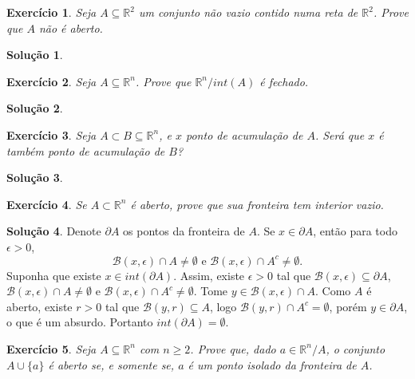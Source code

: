 \documentclass[a4paper,12pt]{article}
\newcommand{\R}{\mathbb{R}}
\newcommand{\B}{\mathcal{B}}
\theoremstyle{exer}
\newtheorem{exercise}{Exercício}
\theoremstyle{definition}
\newtheorem{solution}{Solução}
\theoremstyle{plain}
\begin{document}
\begin{exercise}
    Seja $A \subseteq \R^2$ um conjunto não vazio contido numa reta de $\R^2$. Prove que $A$ não é
    aberto.
\end{exercise}

\begin{solution}

\end{solution}

\begin{exercise}
    Seja $A \subseteq \R^n$. Prove que $\R^n/int(A)$ é fechado.
\end{exercise}

\begin{solution}

\end{solution}

\begin{exercise}
    Seja $A \subset B \subseteq \R^n$, e $x$ ponto de acumulação de $A$. Será que $x$ é também ponto de
    acumulação de $B$?
\end{exercise}

\begin{solution}

\end{solution}

\begin{exercise}
    Se $A \subset \R^n$ é aberto, prove que sua fronteira tem interior vazio.
\end{exercise}

\begin{solution}
    Denote $\partial A$ os pontos da fronteira de $A$. Se $x \in \partial A$,
    então para todo $\epsilon > 0$,
    $$
    \B(x,\epsilon) \cap A \neq \emptyset \text{ e } \B(x,\epsilon) \cap A^c \neq \emptyset .
    $$
    Suponha que existe $x \in int(\partial A)$. Assim, existe $\epsilon > 0$
    tal que $\B(x, \epsilon) \subseteq \partial A$,     $\B(x,\epsilon)
    \cap A \neq \emptyset$ e $\B(x,\epsilon)
    \cap A^c \neq \emptyset$. Tome $y \in \B(x, \epsilon) \cap A$. Como $A$ é
    aberto, existe $r > 0$ tal que $\B(y,r) \subseteq A$, logo $\B(y, r) \cap A^c = \emptyset$,  porém $y \in
    \partial A$, o que é um absurdo. Portanto $int(\partial A) = \emptyset$. 
\end{solution}

\begin{exercise}
    Seja $A \subseteq \R^n$ com $n \ge 2$. Prove que, dado $a \in \R^n/A$, o
    conjunto $A \cup \{a\}$ é aberto se, e somente se, $a$ é um ponto isolado da
    fronteira de $A$. 
\end{exercise}
\end{document}
